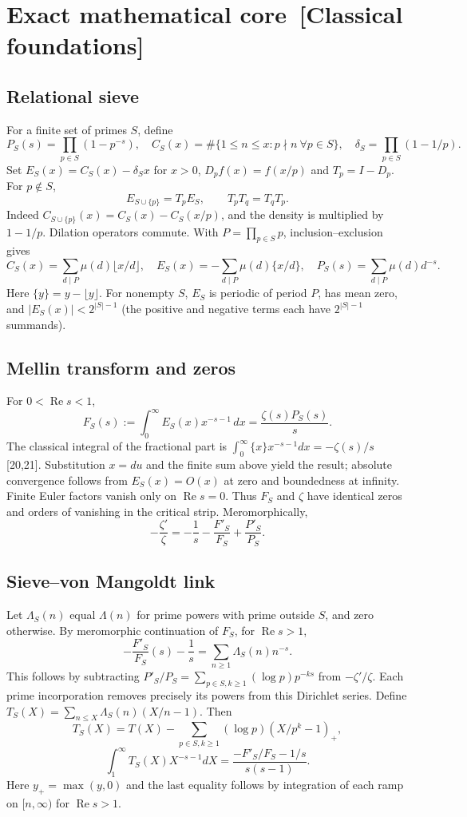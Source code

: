 \documentclass[11pt,a4paper]{article}
\newcommand{\estatuto}[1]{{\normalfont\small\color{tag}\,[#1]}}
\renewcommand{\Re}{\operatorname{Re}}
\begin{document}
\section{Exact mathematical core \estatuto{Classical foundations}}
\subsection{Relational sieve}
For a finite set of primes $S$, define
\[P_S(s)=\prod_{p\in S}(1-p^{-s}),\quad C_S(x)=\#\{1\le n\le x:p\nmid n\ \forall p\in S\},\quad \delta_S=\prod_{p\in S}(1-1/p).\]
Set $E_S(x)=C_S(x)-\delta_S x$ for $x>0$, $D_pf(x)=f(x/p)$ and $T_p=I-D_p$. For $p\notin S$,
\[E_{S\cup\{p\}}=T_pE_S,\qquad T_pT_q=T_qT_p.\]
Indeed $C_{S\cup\{p\}}(x)=C_S(x)-C_S(x/p)$, and the density is multiplied by $1-1/p$. Dilation operators commute. With $P=\prod_{p\in S}p$, inclusion--exclusion gives
\[C_S(x)=\sum_{d\mid P}\mu(d)\lfloor x/d\rfloor,\quad E_S(x)=-\sum_{d\mid P}\mu(d)\{x/d\},\quad P_S(s)=\sum_{d\mid P}\mu(d)d^{-s}.\]
Here $\{y\}=y-\lfloor y\rfloor$. For nonempty $S$, $E_S$ is periodic of period $P$, has mean zero, and $|E_S(x)|<2^{|S|-1}$ (the positive and negative terms each have $2^{|S|-1}$ summands).
\subsection{Mellin transform and zeros}
For $0<\Re s<1$,
\[F_S(s):=\int_0^\infty E_S(x)x^{-s-1}\,dx=\frac{\zeta(s)P_S(s)}s.\]
The classical integral of the fractional part is $\int_0^\infty\{x\}x^{-s-1}dx=-\zeta(s)/s$ [20,21]. Substitution $x=du$ and the finite sum above yield the result; absolute convergence follows from $E_S(x)=O(x)$ at zero and boundedness at infinity. Finite Euler factors vanish only on $\Re s=0$. Thus $F_S$ and $\zeta$ have identical zeros and orders of vanishing in the critical strip. Meromorphically,
\[-\frac{\zeta'}\zeta=-\frac1s-\frac{F'_S}{F_S}+\frac{P'_S}{P_S}.\]
\subsection{Sieve--von Mangoldt link}
Let $\Lambda_S(n)$ equal $\Lambda(n)$ for prime powers with prime outside $S$, and zero otherwise. By meromorphic continuation of $F_S$, for $\Re s>1$,
\[-\frac{F'_S}{F_S}(s)-\frac1s=\sum_{n\ge1}\Lambda_S(n)n^{-s}.\tag{3.3}\]
This follows by subtracting $P'_S/P_S=\sum_{p\in S,k\ge1}(\log p)p^{-ks}$ from $-\zeta'/\zeta$. Each prime incorporation removes precisely its powers from this Dirichlet series. Define $T_S(X)=\sum_{n\le X}\Lambda_S(n)(X/n-1)$. Then
\[T_S(X)=T(X)-\sum_{p\in S,k\ge1}(\log p)(X/p^k-1)_+,\]
\[\int_1^\infty T_S(X)X^{-s-1}dX=\frac{-F'_S/F_S-1/s}{s(s-1)}.\]
Here $y_+=\max(y,0)$ and the last equality follows by integration of each ramp on $[n,\infty)$ for $\Re s>1$.
\end{document}
